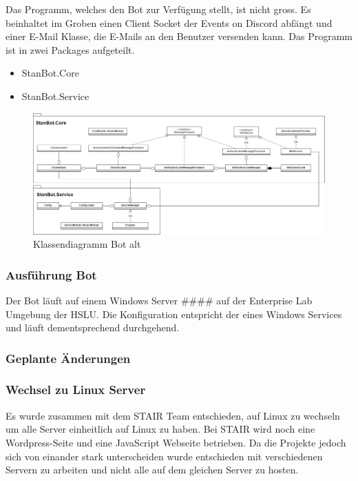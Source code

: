 \documentclass[a4paper, table]{article}
\begin{document}
Das Programm, welches den Bot zur Verfügung stellt, ist nicht gross. Es beinhaltet im Groben einen Client Socket der
Events on Discord abfängt und einer E-Mail Klasse, die E-Mails an den Benutzer versenden kann.
Das Programm ist in zwei Packages aufgeteilt.

\begin{itemize}
    \item StanBot.Core
    \item StanBot.Service
\end{itemize}

\begin{figure}[h]
    \centering
    \hspace*{-1.5cm}
    \includegraphics[width=1.2\textwidth]{img/Klassendiagramm_Bot_alt.png}
    \caption{Klassendiagramm Bot alt}
    \label{fig:Klassendiagramm_Bot_alt}
\end{figure}

\subsubsection{Ausführung Bot}

Der Bot läuft auf einem Windows Server \#\#\#\# auf der Enterprise Lab Umgebung der HSLU. Die Konfiguration entspricht der eines
Windows Services und läuft dementsprechend durchgehend.
\newline
{}
\newline


\subsubsection{Geplante Änderungen}

\subsubsection*{Wechsel zu Linux Server}

Es wurde zusammen mit dem STAIR Team entschieden,
auf Linux zu wechseln um alle Server einheitlich auf Linux zu haben.
Bei STAIR wird noch eine Wordpress-Seite und eine JavaScript Webseite betrieben.
Da die Projekte jedoch sich von einander stark unterscheiden wurde entschieden mit verschiedenen Servern zu arbeiten und nicht alle auf dem gleichen Server zu hosten.
\end{document}
